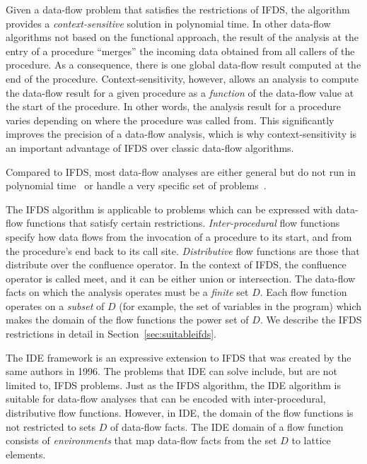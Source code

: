 Given a data-flow problem that satisfies the restrictions of IFDS, the algorithm provides a \textit{context-sensitive} solution in polynomial time. In other data-flow algorithms not based on the functional approach, the result of the analysis at the entry of a procedure ``merges'' the incoming data obtained from all callers of the procedure. As a consequence, there is one global data-flow result computed at the end of the procedure. Context-sensitivity, however, allows an analysis to compute the data-flow result for a given procedure as a \textit{function} of the data-flow value at the start of the procedure. 
In other words, the analysis result for a procedure varies depending on where the procedure was called from. This significantly improves the precision of a data-flow analysis, which is why context-sensitivity is an important advantage of IFDS over classic data-flow algorithms.

Compared to IFDS, most data-flow analyses are either general but do not run in polynomial time~\cite{knoop1992interprocedural,pnueli1981two} or handle a very specific set of problems~\cite{knoop1993efficient}.

The IFDS algorithm is applicable to problems which can be expressed with data-flow functions that satisfy certain restrictions. \textit{Inter-procedural} flow functions specify how data flows from the invocation of a procedure to its start, and from the procedure's end back to its call site. \textit{Distributive} flow functions are those that distribute over the confluence operator. In the context of IFDS, the confluence operator is called meet, and it can be either union or intersection. The data-flow facts on which the analysis operates must be a \textit{finite} set $D$. Each flow function operates on a \textit{subset} of $D$ (for example, the set of variables in the program) which makes the domain of the flow functions the power set of $D$. We describe the IFDS restrictions in detail in Section~\ref{sec:suitableifds}.

The IDE framework is an expressive extension to IFDS that was created by the same authors in 1996.
The problems that IDE can solve include, but are not limited to, IFDS problems. Just as the IFDS algorithm, the IDE algorithm is suitable for data-flow analyses that can be encoded with inter-procedural, distributive flow functions. However, in IDE, the domain of the flow functions is not restricted to sets $D$ of data-flow facts. The IDE domain of a flow function consists of \textit{environments} that map data-flow facts from the set $D$ to lattice elements.

